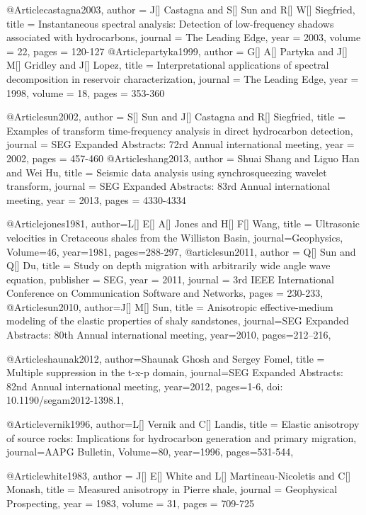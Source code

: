 @Article{castagna2003,
  author = 	 {J[] Castagna and S[] Sun and R[] W[] Siegfried},
  title = 	 {Instantaneous spectral analysis: Detection of low-frequency shadows associated with hydrocarbons},
  journal = 	 {The Leading Edge},
  year = 	 2003,
  volume = 	 22,
  pages = 	 {120-127}
}
@Article{partyka1999,
  author = 	 {G[] A[] Partyka and J[] M[] Gridley and J[] Lopez},
  title = 	 {Interpretational applications of spectral decomposition in reservoir characterization},
  journal = 	 {The Leading Edge},
  year = 	 1998,
  volume = 	 18,
  pages = 	 {353-360}
}


@Article{sun2002,
  author = 	 {S[] Sun and J[] Castagna and R[] Siegfried},
  title = 	 {Examples of 
   transform time-frequency analysis in direct hydrocarbon detection},
  journal = 	 {SEG Expanded Abstracts: 72rd Annual international meeting},
  year = 	 2002,
  pages = 	 {457-460}
}
@Article{shang2013,
  author = 	 {Shuai Shang and Liguo Han and Wei Hu},
  title = 	 {Seismic data analysis using synchrosqueezing wavelet transform},
  journal = 	 {SEG Expanded Abstracts: 83rd Annual international meeting},
  year = 	 2013,
  pages = 	 {4330-4334}
}

@Article{jones1981,
  author={L[] E[] A[] Jones and H[] F[] Wang},
  title = {Ultrasonic velocities in Cretaceous shales from the Williston Basin},
  journal={Geophysics},
  Volume=46,
  year=1981,
  pages={288-297},
}
@article{sun2011,
  author =	 {Q[] Sun and Q[] Du},
  title =	 {Study on depth migration with arbitrarily wide angle wave equation},
  publisher =	 {SEG},
  year =	 2011,
  journal =	 {3rd IEEE International Conference on Communication Software and Networks},
  pages =	 {230-233},
}
@Article{sun2010,
  author={J[] M[] Sun},
  title = {Anisotropic effective-medium modeling of the elastic properties of shaly sandstones},
  journal={SEG Expanded Abstracts: 80th Annual international meeting},
  year=2010,
  pages={212–216},
}


@Article{shaunak2012,
  author={Shaunak Ghosh and Sergey Fomel},
  title = {Multiple suppression in the t-x-p domain},
  journal={SEG Expanded Abstracts: 82nd Annual international meeting},
  year=2012,
  pages={1-6, doi: 10.1190/segam2012-1398.1},
}

@Article{vernik1996,
  author={L[] Vernik and C[] Landis},
  title = {Elastic anisotropy of source rocks: Implications for hydrocarbon
generation and primary migration},
  journal={AAPG Bulletin},
  Volume=80,
  year=1996,
  pages={531-544},
}

@Article{white1983,
  author = 	 {J[] E[] White and L[] Martineau-Nicoletis and C[] Monash},
  title = 	 {Measured anisotropy in Pierre shale},
  journal = 	 {Geophysical Prospecting},
  year = 	 1983,
  volume =	 31,
  pages =	 {709-725}
}

